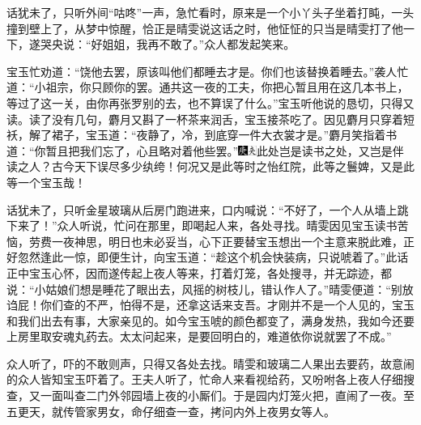 话犹未了，只听外间“咕咚”一声，急忙看时，原来是一个小丫头子坐着打盹，一头撞到壁上了，从梦中惊醒，恰正是晴雯说这话之时，他怔怔的只当是晴雯打了他一下，遂哭央说：“好姐姐，我再不敢了。”众人都发起笑来。

宝玉忙劝道：“饶他去罢，原该叫他们都睡去才是。你们也该替换着睡去。”袭人忙道：“小祖宗，你只顾你的罢。通共这一夜的工夫，你把心暂且用在这几本书上，等过了这一关，由你再张罗别的去，也不算误了什么。”宝玉听他说的恳切，只得又读。读了没有几句，麝月又斟了一杯茶来润舌，宝玉接茶吃了。因见麝月只穿着短袄，解了裙子，宝玉道：“夜静了，冷，到底穿一件大衣裳才是。”麝月笑指着书道：“你暂且把我们忘了，心且略对着他些罢。”{\includegraphics[width=3mm]{../Images/00004}\includegraphics[width=3mm]{../Images/00012}\footnotesize \kaishu 此处岂是读书之处，又岂是伴读之人？古今天下误尽多少纨绔！何况又是此等时之怡红院，此等之鬟婢，又是此等一个宝玉哉！}

话犹未了，只听金星玻璃从后房门跑进来，口内喊说：“不好了，一个人从墙上跳下来了！”众人听说，忙问在那里，即喝起人来，各处寻找。晴雯因见宝玉读书苦恼，劳费一夜神思，明日也未必妥当，心下正要替宝玉想出一个主意来脱此难，正好忽然逢此一惊，即便生计，向宝玉道：“趁这个机会快装病，只说唬着了。”此话正中宝玉心怀，因而遂传起上夜人等来，打着灯笼，各处搜寻，并无踪迹，都说：“小姑娘们想是睡花了眼出去，风摇的树枝儿，错认作人了。”晴雯便道：“别放诌屁！你们查的不严，怕得不是，还拿这话来支吾。才刚并不是一个人见的，宝玉和我们出去有事，大家亲见的。如今宝玉唬的颜色都变了，满身发热，我如今还要上房里取安魂丸药去。太太问起来，是要回明白的，难道依你说就罢了不成。”

众人听了，吓的不敢则声，只得又各处去找。晴雯和玻璃二人果出去要药，故意闹的众人皆知宝玉吓着了。王夫人听了，忙命人来看视给药，又吩咐各上夜人仔细搜查，又一面叫查二门外邻园墙上夜的小厮们。于是园内灯笼火把，直闹了一夜。至五更天，就传管家男女，命仔细查一查，拷问内外上夜男女等人。

